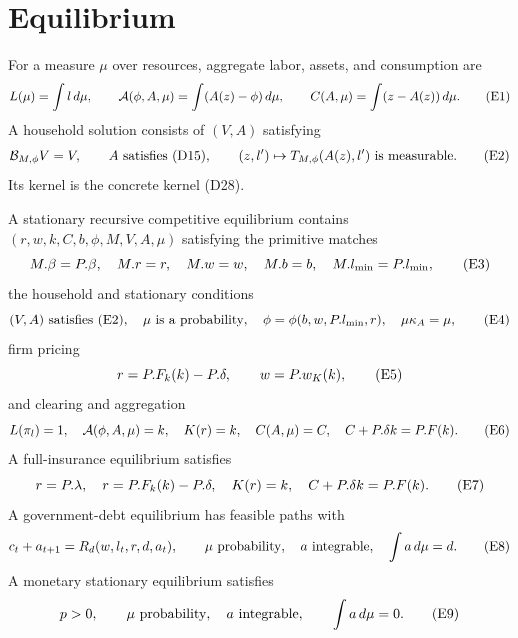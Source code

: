 \documentclass[11pt]{article}
\newcommand{\eqE}[1]{\refstepcounter{equation}\tag{E#1}}
\begin{document}
\section{Equilibrium}

For a measure \(\mu\) over resources, aggregate labor, assets, and consumption
are
\begin{equation}
 L(\mu)=\int l\,d\mu,\qquad
 \mathcal A(\phi,A,\mu)=\int(A(z)-\phi)\,d\mu,\qquad
 C(A,\mu)=\int(z-A(z))\,d\mu. \eqE{1}\label{E1}
\end{equation}
A household solution consists of \((V,A)\) satisfying
\begin{equation}
 \mathcal B_{M,\phi}V=V,\qquad A\text{ satisfies (D15)},\qquad
 (z,l')\mapsto T_{M,\phi}(A(z),l')\text{ is measurable}. \eqE{2}\label{E2}
\end{equation}
Its kernel is the concrete kernel (D28).

A stationary recursive competitive equilibrium contains
\((r,w,k,C,b,\phi,M,V,A,\mu)\) satisfying the primitive matches
\begin{equation}
 M.\beta=P.\beta,\quad M.r=r,\quad M.w=w,\quad M.b=b,\quad
 M.l_{\min}=P.l_{\min}, \eqE{3}\label{E3}
\end{equation}
the household and stationary conditions
\begin{equation}
 (V,A)\text{ satisfies (E2)},\quad \mu\text{ is a probability},\quad
 \phi=\phi(b,w,P.l_{\min},r),\quad \mu\kappa_A=\mu, \eqE{4}\label{E4}
\end{equation}
firm pricing
\begin{equation}
 r=P.F_k(k)-P.\delta,\qquad w=P.w_K(k), \eqE{5}\label{E5}
\end{equation}
and clearing and aggregation
\begin{equation}
 L(\pi_l)=1,\quad \mathcal A(\phi,A,\mu)=k,\quad K(r)=k,\quad
 C(A,\mu)=C,\quad C+P.\delta k=P.F(k). \eqE{6}\label{E6}
\end{equation}
A full-insurance equilibrium satisfies
\begin{equation}
 r=P.\lambda,\quad r=P.F_k(k)-P.\delta,\quad K(r)=k,\quad
 C+P.\delta k=P.F(k). \eqE{7}\label{E7}
\end{equation}
A government-debt equilibrium has feasible paths with
\begin{equation}
 c_t+a_{t+1}=R_d(w,l_t,r,d,a_t),\qquad
 \mu\text{ probability},\quad a\text{ integrable},\quad \int a\,d\mu=d. \eqE{8}\label{E8}
\end{equation}
A monetary stationary equilibrium satisfies
\begin{equation}
 p>0,\qquad \mu\text{ probability},\quad a\text{ integrable},
 \qquad\int a\,d\mu=0. \eqE{9}\label{E9}
\end{equation}
\end{document}
